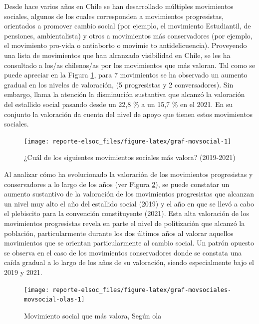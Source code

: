 \documentclass[
  12pt,
]{book}
\begin{document}
Desde hace varios años en Chile se han desarrollado múltiples movimientos sociales, algunos de los cuales corresponden a movimientos progresistas, orientados a promover cambio social (por ejemplo, el movimiento Estudiantil, de pensiones, ambientalista) y otros a movimientos más conservadores (por ejemplo, el movimiento pro-vida o antiaborto o movimie to antidelicuencia). Proveyendo una lista de movimientos que han alcanzado visibilidad en Chile, se les ha consultado a los/as chilenos/as por los movimientos que más valoran. Tal como se puede apreciar en la Figura \ref{fig:graf-movsocial}, para 7 movimientos se ha observado un aumento gradual en los niveles de valoración, (5 progresistas y 2 conversadores). Sin embargo, llama la atención la disminución sustantiva que alcanzó la valoración del estallido social pasando desde un 22,8 \% a un 15,7 \% en el 2021. En su conjunto la valoración da cuenta del nivel de apoyo que tienen estos movimientos sociales.

\begin{figure}

{\centering \texttt{[image: reporte-elsoc\_files/figure-latex/graf-movsocial-1]} 

}

\caption{¿Cuál de los siguientes movimientos sociales más valora? (2019-2021)}\label{fig:graf-movsocial}
\end{figure}

Al analizar cómo ha evolucionado la valoración de los movimientos progresistas y conservadores a lo largo de los años (ver Figura \ref{fig:graf-movsociales-movsocial-olas}), se puede constatar un aumento sustantivo de la valoración de los movimientos progresistas que alcanzan un nivel muy alto el año del estallido social (2019) y el año en que se llevó a cabo el plebiscito para la convención constituyente (2021). Esta alta valoración de los movimientos progresistas revela en parte el nivel de politización que alcanzó la población, particularmente durante los dos últimos años al valorar aquellos movimientos que se orientan particularmente al cambio social. Un patrón opuesto se observa en el caso de los movimientos conservadores donde se constata una caída gradual a lo largo de los años de su valoración, siendo especialmente bajo el 2019 y 2021.

\begin{figure}

{\centering \texttt{[image: reporte-elsoc\_files/figure-latex/graf-movsociales-movsocial-olas-1]} 

}

\caption{Movimiento social que más valora, Según ola}\label{fig:graf-movsociales-movsocial-olas}
\end{figure}
\end{document}
